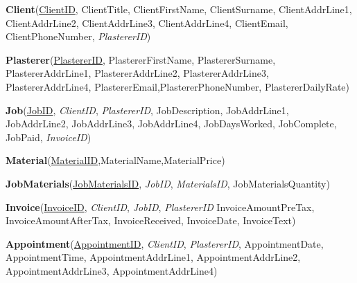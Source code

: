 \begin{flushleft}
	\textbf{Client}(\underline{ClientID}, ClientTitle, ClientFirstName, ClientSurname, ClientAddrLine1, ClientAddrLine2, ClientAddrLine3, ClientAddrLine4, ClientEmail, ClientPhoneNumber, \emph{PlastererID})
\end{flushleft}



\begin{flushleft}
	\textbf{Plasterer}(\underline{PlastererID}, PlastererFirstName, PlastererSurname, PlastererAddrLine1, PlastererAddrLine2, PlastererAddrLine3, PlastererAddrLine4, PlastererEmail,PlastererPhoneNumber, PlastererDailyRate)
\end{flushleft}



\begin{flushleft}
\textbf{Job}(\underline{JobID}, \emph{ClientID}, \emph{PlastererID}, JobDescription, JobAddrLine1, JobAddrLine2, JobAddrLine3, JobAddrLine4, JobDaysWorked,  JobComplete, JobPaid, \emph{InvoiceID})
\end{flushleft}


\begin{flushleft}
\textbf{Material}(\underline{MaterialID},MaterialName,MaterialPrice)
\end{flushleft}


\begin{flushleft}
\textbf{JobMaterials}(\underline{JobMaterialsID}, \emph{JobID}, \emph{MaterialsID}, JobMaterialsQuantity)
\end{flushleft}


\begin{flushleft}
\textbf{Invoice}(\underline{InvoiceID}, \emph{ClientID}, \emph{JobID}, \emph{PlastererID} InvoiceAmountPreTax, InvoiceAmountAfterTax, InvoiceReceived, InvoiceDate, InvoiceText)
\end{flushleft}



\begin{flushleft}
\textbf{Appointment}(\underline{AppointmentID}, \emph{ClientID}, \emph{PlastererID}, AppointmentDate, AppointmentTime, AppointmentAddrLine1, AppointmentAddrLine2, AppointmentAddrLine3, AppointmentAddrLine4)
\end{flushleft}

